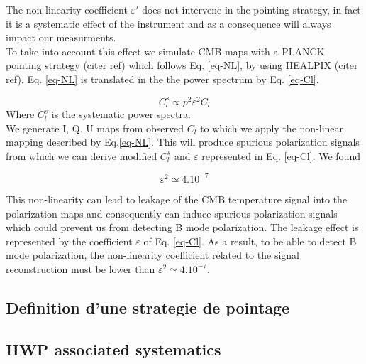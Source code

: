 The non-linearity coefficient $\varepsilon'$ does not intervene in the pointing strategy, in fact it is a systematic effect of the instrument and as a consequence will always impact our measurments. \\
To take into account this effect we simulate CMB maps with a PLANCK pointing strategy (citer ref) which follows Eq. \ref{eq-NL}, by using HEALPIX (citer ref).
Eq. \ref{eq-NL} is translated in the the power spectrum by Eq. \ref{eq-Cl}.

\begin{equation}
C_{l}^{s} \propto p^{2} \varepsilon^{2} C_{l}
\label{eq-Cl}
\end{equation}
Where $C_{l}^{s}$ is the systematic power spectra.\\

We generate I, Q, U maps from observed $C_{l}$ to which we apply the non-linear mapping described by Eq.\ref{eq-NL}. This will produce spurious polarization signals from which we can derive modified $C_{l}^{s}$ and $\varepsilon$ represented in Eq. \ref{eq-Cl}. We found 

\begin{equation}
\varepsilon^{2} \simeq 4.10^{-7}
\label{epsilon}
\end{equation}

This non-linearity can lead to leakage of the CMB temperature signal into the polarization maps and consequently can induce spurious polarization signals which could prevent us from detecting B mode polarization. The leakage effect is represented by the coefficient $\varepsilon$ of Eq. \ref{eq-Cl}. As a result, to be able to detect B mode polarization, the non-linearity coefficient related to the signal reconstruction must be lower than $\varepsilon^{2} \simeq 4.10^{-7}$.



\subsection{Definition d'une strategie de pointage}

\subsection{HWP associated systematics}


